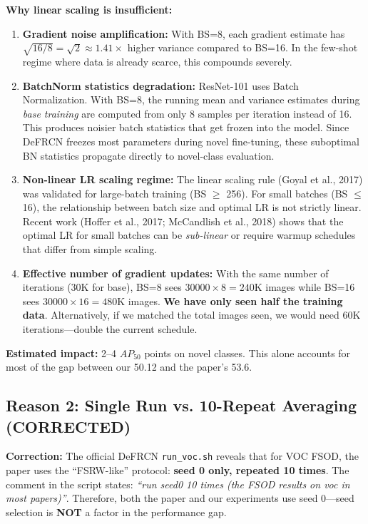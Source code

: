 \documentclass[11pt,a4paper]{article}
\begin{document}
\textbf{Why linear scaling is insufficient:}
\begin{enumerate}[nosep]
    \item \textbf{Gradient noise amplification:} With BS=8, each gradient estimate has $\sqrt{16/8} = \sqrt{2} \approx 1.41\times$ higher variance compared to BS=16. In the few-shot regime where data is already scarce, this compounds severely.

    \item \textbf{BatchNorm statistics degradation:} ResNet-101 uses Batch Normalization. With BS=8, the running mean and variance estimates during \textit{base training} are computed from only 8 samples per iteration instead of 16. This produces noisier batch statistics that get frozen into the model. Since DeFRCN freezes most parameters during novel fine-tuning, these suboptimal BN statistics propagate directly to novel-class evaluation.

    \item \textbf{Non-linear LR scaling regime:} The linear scaling rule (Goyal et al., 2017) was validated for large-batch training (BS $\geq$ 256). For small batches (BS $\leq$ 16), the relationship between batch size and optimal LR is not strictly linear. Recent work (Hoffer et al., 2017; McCandlish et al., 2018) shows that the optimal LR for small batches can be \textit{sub-linear} or require warmup schedules that differ from simple scaling.

    \item \textbf{Effective number of gradient updates:} With the same number of iterations (30K for base), BS=8 sees $30000 \times 8 = 240$K images while BS=16 sees $30000 \times 16 = 480$K images. \textbf{We have only seen half the training data}. Alternatively, if we matched the total images seen, we would need 60K iterations---double the current schedule.
\end{enumerate}

\textbf{Estimated impact:} 2--4 $AP_{50}$ points on novel classes. This alone accounts for most of the gap between our 50.12 and the paper's 53.6.

\subsection{Reason 2: Single Run vs. 10-Repeat Averaging (CORRECTED)}

\textbf{Correction:} The official DeFRCN \texttt{run\_voc.sh} reveals that for VOC FSOD, the paper uses the ``FSRW-like'' protocol: \textbf{seed 0 only, repeated 10 times}. The comment in the script states: \textit{``run seed0 10 times (the FSOD results on voc in most papers)''}. Therefore, both the paper and our experiments use seed 0---seed selection is \textbf{NOT} a factor in the performance gap.
\end{document}
